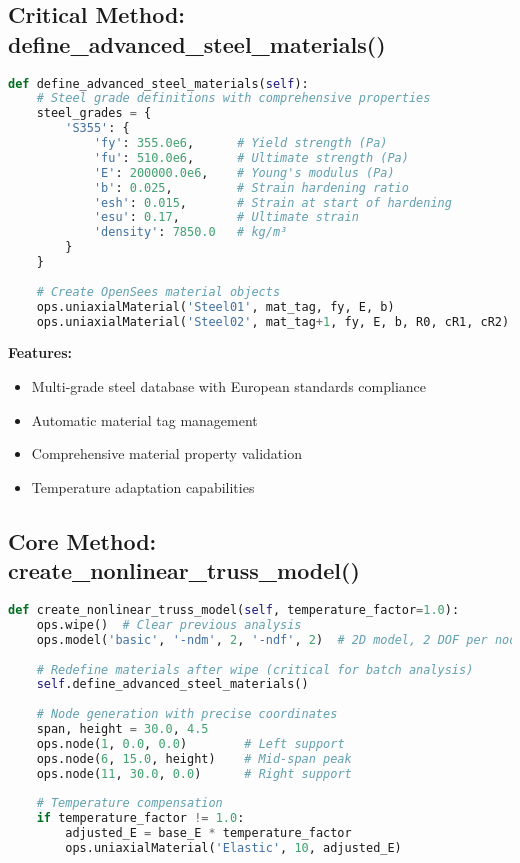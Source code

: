 \documentclass[12pt,a4paper]{article}
\begin{document}
\subsection{Critical Method: define\_advanced\_steel\_materials()}

\begin{lstlisting}[language=Python, caption=Advanced Steel Materials Definition]
def define_advanced_steel_materials(self):
    # Steel grade definitions with comprehensive properties
    steel_grades = {
        'S355': {
            'fy': 355.0e6,      # Yield strength (Pa)
            'fu': 510.0e6,      # Ultimate strength (Pa) 
            'E': 200000.0e6,    # Young's modulus (Pa)
            'b': 0.025,         # Strain hardening ratio
            'esh': 0.015,       # Strain at start of hardening
            'esu': 0.17,        # Ultimate strain
            'density': 7850.0   # kg/m³
        }
    }
    
    # Create OpenSees material objects
    ops.uniaxialMaterial('Steel01', mat_tag, fy, E, b)
    ops.uniaxialMaterial('Steel02', mat_tag+1, fy, E, b, R0, cR1, cR2)
\end{lstlisting}

\textbf{Features:}
\begin{itemize}
    \item Multi-grade steel database with European standards compliance
    \item Automatic material tag management
    \item Comprehensive material property validation
    \item Temperature adaptation capabilities
\end{itemize}

\subsection{Core Method: create\_nonlinear\_truss\_model()}

\begin{lstlisting}[language=Python, caption=Nonlinear Truss Model Creation]
def create_nonlinear_truss_model(self, temperature_factor=1.0):
    ops.wipe()  # Clear previous analysis
    ops.model('basic', '-ndm', 2, '-ndf', 2)  # 2D model, 2 DOF per node
    
    # Redefine materials after wipe (critical for batch analysis)
    self.define_advanced_steel_materials()
    
    # Node generation with precise coordinates
    span, height = 30.0, 4.5
    ops.node(1, 0.0, 0.0)        # Left support
    ops.node(6, 15.0, height)    # Mid-span peak
    ops.node(11, 30.0, 0.0)      # Right support
    
    # Temperature compensation
    if temperature_factor != 1.0:
        adjusted_E = base_E * temperature_factor
        ops.uniaxialMaterial('Elastic', 10, adjusted_E)
\end{lstlisting}
\end{document}
